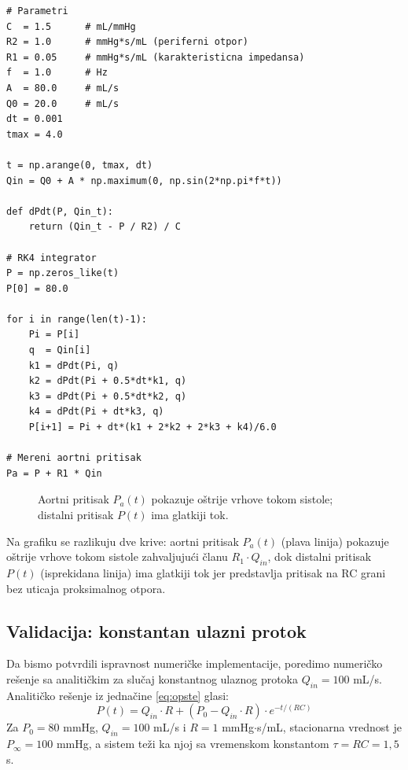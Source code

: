 \documentclass[12pt,a4paper]{article}
\begin{document}
\begin{lstlisting}[caption={Simulacija troelementnog modela (RK4 metoda).},label={lst:3elem}]
# Parametri
C  = 1.5      # mL/mmHg
R2 = 1.0      # mmHg*s/mL (periferni otpor)
R1 = 0.05     # mmHg*s/mL (karakteristicna impedansa)
f  = 1.0      # Hz
A  = 80.0     # mL/s
Q0 = 20.0     # mL/s
dt = 0.001
tmax = 4.0

t = np.arange(0, tmax, dt)
Qin = Q0 + A * np.maximum(0, np.sin(2*np.pi*f*t))

def dPdt(P, Qin_t):
    return (Qin_t - P / R2) / C

# RK4 integrator
P = np.zeros_like(t)
P[0] = 80.0

for i in range(len(t)-1):
    Pi = P[i]
    q  = Qin[i]
    k1 = dPdt(Pi, q)
    k2 = dPdt(Pi + 0.5*dt*k1, q)
    k3 = dPdt(Pi + 0.5*dt*k2, q)
    k4 = dPdt(Pi + dt*k3, q)
    P[i+1] = Pi + dt*(k1 + 2*k2 + 2*k3 + k4)/6.0

# Mereni aortni pritisak
Pa = P + R1 * Qin
\end{lstlisting}

\begin{figure}[H]
    \centering
    \caption{Aortni pritisak $P_a(t)$ pokazuje oštrije vrhove tokom sistole; distalni pritisak $P(t)$ ima glatkiji tok.}
    \label{fig:sim3}
\end{figure}

Na grafiku se razlikuju dve krive: aortni pritisak $P_a(t)$ (plava linija) pokazuje oštrije vrhove tokom sistole zahvaljujući članu $R_1\cdot Q_{in}$, dok distalni pritisak $P(t)$ (isprekidana linija) ima glatkiji tok jer predstavlja pritisak na RC grani bez uticaja proksimalnog otpora.

\subsection{Validacija: konstantan ulazni protok}

Da bismo potvrdili ispravnost numeričke implementacije, poredimo numeričko rešenje sa analitičkim za slučaj konstantnog ulaznog protoka $Q_{in} = 100$ mL/s. Analitičko rešenje iz jednačine \eqref{eq:opste} glasi:
\begin{equation}
    P(t) = Q_{in}\cdot R + (P_0 - Q_{in}\cdot R)\cdot e^{-t/(RC)}
\end{equation}
Za $P_0 = 80$ mmHg, $Q_{in} = 100$ mL/s i $R = 1$ mmHg$\cdot$s/mL, stacionarna vrednost je $P_\infty = 100$ mmHg, a sistem teži ka njoj sa vremenskom konstantom $\tau = RC = 1{,}5$ s.
\end{document}
